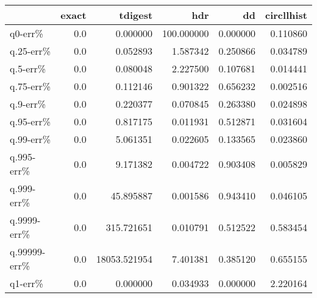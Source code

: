 \begin{tabular}{lrrrrr}
\toprule
{} &  exact &       tdigest &         hdr &        dd &  circllhist \\
\midrule
q0-err\%      &    0.0 &      0.000000 &  100.000000 &  0.000000 &    0.110860 \\
q.25-err\%    &    0.0 &      0.052893 &    1.587342 &  0.250866 &    0.034789 \\
q.5-err\%     &    0.0 &      0.080048 &    2.227500 &  0.107681 &    0.014441 \\
q.75-err\%    &    0.0 &      0.112146 &    0.901322 &  0.656232 &    0.002516 \\
q.9-err\%     &    0.0 &      0.220377 &    0.070845 &  0.263380 &    0.024898 \\
q.95-err\%    &    0.0 &      0.817175 &    0.011931 &  0.512871 &    0.031604 \\
q.99-err\%    &    0.0 &      5.061351 &    0.022605 &  0.133565 &    0.023860 \\
q.995-err\%   &    0.0 &      9.171382 &    0.004722 &  0.903408 &    0.005829 \\
q.999-err\%   &    0.0 &     45.895887 &    0.001586 &  0.943410 &    0.046105 \\
q.9999-err\%  &    0.0 &    315.721651 &    0.010791 &  0.512522 &    0.583454 \\
q.99999-err\% &    0.0 &  18053.521954 &    7.401381 &  0.385120 &    0.655155 \\
q1-err\%      &    0.0 &      0.000000 &    0.034933 &  0.000000 &    2.220164 \\
\bottomrule
\end{tabular}
